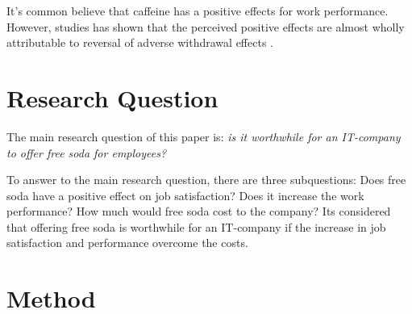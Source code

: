 \documentclass[a4paper]{article}
\begin{document}
\begin{comment}
What has been done related to this (mainly in academic publications)? 
What do the authors say about the topic? 
How does your research question relate to these previous studies? 
How do you apply them or add to them? Based on what they say, what do you say?  
\end{comment}

It's common believe that caffeine has a positive effects for work performance. However, studies has shown that the perceived positive effects are almost wholly attributable to reversal of adverse withdrawal effects \citep{james2005}.



\section{Research Question}

The main research question of this paper is: \textit{is it worthwhile for an IT-company to offer free soda for employees?} 

To answer to the main research question, there are three subquestions: Does free soda have a positive effect on job satisfaction? Does it increase the work performance? How much would free soda cost to the company? Its considered that offering free soda is worthwhile for an IT-company if the increase in job satisfaction and performance overcome the costs.

\begin{comment}
Based on what other people have studied before, what is the question that no one has really answered yet? 
What is the main question, and what are perhaps the two or three sub-questions that you need to answer to be able to answer the main question? 
Be sure of what you write, because you will have to answer to this question ☺
\end{comment}

\section{Method}

\begin{comment}
How do you find an answer to the research question? 
How do you gather data? 
From where do you gather data? 
How do you analyze the data? 
Out of all the methods in the world, why did you choose this one? 
What is good about it and what is not? 
What were the alternative methods, and what were their pros and cons? 
\end{comment}
\end{document}

